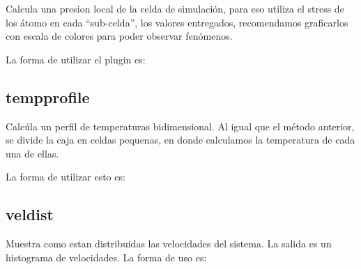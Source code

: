 Calcula una presion local de la celda de simulaci\'on, para eso utiliza el
stress de los \'atomo en cada ``sub-celda'', los valores entregados,
recomendamos graficarlos con escala de colores para poder observar fen\'omenos. 

La forma de utilizar el plugin es:


\subsection{tempprofile}
Calc\'ula un perfil de temperaturas bidimensional. Al igual que el m\'etodo
anterior, se divide la caja en celdas pequenas, en donde calculamos la
temperatura de cada una de ellas.

La forma de utilizar esto es:


\subsection{veldist}
Muestra como estan distribuidas las velocidades del sistema. La salida es un
histograma de velocidades. La forma de uso es:


